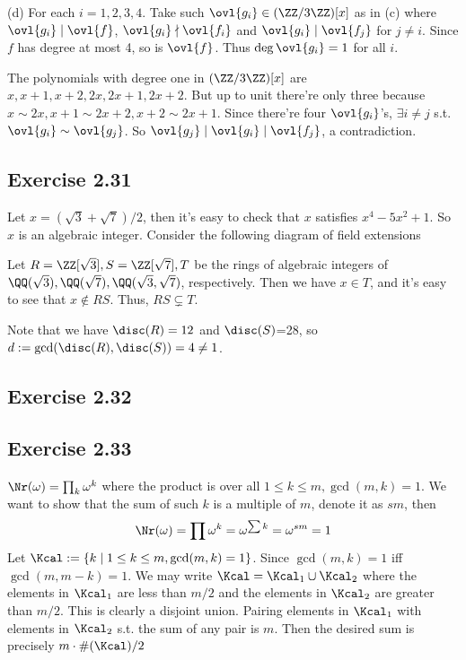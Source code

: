 \documentclass[../Chapter.tex]{subfiles}
\begin{document}
(d) For each $i=1,2,3,4$. Take such $\ovl{g_i}\in(\ZZ/3\ZZ)[x]$ as in (c) where $\ovl{g_i}\mid\ovl{f}$, $\ovl{g_i}\nmid\ovl{f_i}$ and $\ovl{g_i}\mid\ovl{f_j}$ for $j\neq i$. Since $f$ has degree at most 4, so is $\ovl{f}$. Thus $\deg\ovl{g_i}=1$ for all $i$.

The polynomials with degree one in $(\ZZ/3\ZZ)[x]$ are $x,x+1,x+2,2x,2x+1,2x+2$. But up to unit there're only three because $x\sim2x,x+1\sim2x+2,x+2\sim2x+1$. Since there're four $\ovl{g_i}$'s, $\exists i\neq j$ s.t. $\ovl{g_i}\sim \ovl{g_j}$. So $\ovl{g_j}\mid\ovl{g_i}\mid\ovl{f_j}$, a contradiction. 

\subsection*{Exercise 2.31}

Let $x=(\sqrt{3}+\sqrt{7})/2$, then it's easy to check that $x$ satisfies $x^4-5x^2+1$. So $x$ is an algebraic integer. Consider the following diagram of field extensions
\begin{center}
\end{center}
Let $R=\ZZ[\sqrt{3}],S=\ZZ[\sqrt{7}],T$ be the rings of algebraic integers of $\QQ(\sqrt{3}),\QQ(\sqrt{7}),\QQ(\sqrt{3},\sqrt{7})$, respectively. Then we have $x\in T$, and it's easy to see that $x\notin RS$. Thus, $RS\varsubsetneq T$. 

Note that we have $\disc(R)=12$ and $\disc(S)$=28, so $d:=\gcd(\disc(R),\disc(S))=4\neq1$.

\subsection*{Exercise 2.32}

\subsection*{Exercise 2.33}

$\Nr(\omega)=\prod_{k} \omega^k$ where the product is over all $1\leq k\leq m,\gcd(m,k)=1$. We want to show that the sum of such $k$ is a multiple of $m$, denote it as $sm$, then $$\Nr(\omega)=\prod \omega^k=\omega^{\sum k}=\omega^{sm}=1$$ Let $\Kcal:=\{k\mid 1\leq k\leq m,\gcd(m,k)=1\}$. Since $\gcd(m,k)=1$ iff $\gcd(m,m-k)=1$. We may write $\Kcal=\Kcal_1\cup\Kcal_2$ where the elements in $\Kcal_1$ are less than $m/2$ and the elements in $\Kcal_2$ are greater than $m/2$. This is clearly a disjoint union. Pairing elements in $\Kcal_1$ with elements in $\Kcal_2$ s.t. the sum of any pair is $m$. Then the desired sum is precisely $m\cdot\#(\Kcal)/2$
\end{document}
